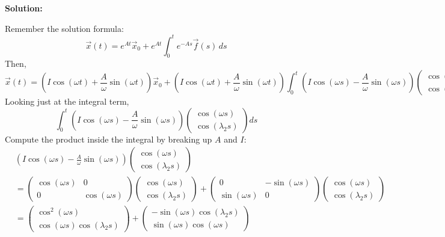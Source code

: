 \documentclass[12pt]{article}
\newenvironment{solution}{
    \textbf{Solution:}
    
}{
    
    \vspace{2em}
}
\begin{document}
\begin{solution}
    Remember the solution formula:
    \[
        \vec{x}(t) = e^{At}\vec{x}_0 + e^{At} \int_0^t e^{-As} \vec{f}(s) \, ds
    \]
    Then,
    \[
        \vec{x}(t) = \left( I \cos(\omega t) + \frac{A}{\omega} \sin(\omega t) \right) \vec{x}_0 + \left( I \cos(\omega t) + \frac{A}{\omega} \sin(\omega t) \right) \int_0^t \left( I \cos(\omega s) - \frac{A}{\omega} \sin(\omega s) \right) \begin{pmatrix} \cos(\lambda_1 s) \\ \cos(\lambda_2 s) \end{pmatrix} ds
    \]
    Looking just at the integral term,
    \[
        \int_0^t \left( I \cos(\omega s) - \frac{A}{\omega} \sin(\omega s) \right) \begin{pmatrix} \cos(\omega s) \\ \cos(\lambda_2 s) \end{pmatrix} ds
    \]
    Compute the product inside the integral by breaking up \(A\) and \(I\):
    \[
        \begin{aligned}
            &\left( I \cos(\omega s) - \frac{A}{\omega} \sin(\omega s) \right) \begin{pmatrix} \cos(\omega s) \\ \cos(\lambda_2 s) \end{pmatrix} \\
            &= \begin{pmatrix} \cos(\omega s) & 0 \\ 0 & \cos(\omega s) \end{pmatrix} \begin{pmatrix} \cos(\omega s) \\ \cos(\lambda_2 s) \end{pmatrix} + \begin{pmatrix} 0 & -\sin(\omega s) \\ \sin(\omega s) & 0 \end{pmatrix} \begin{pmatrix} \cos(\omega s) \\ \cos(\lambda_2 s) \end{pmatrix} \\
            &= \begin{pmatrix} \cos^2(\omega s) \\ \cos(\omega s)\cos(\lambda_2 s) \end{pmatrix} + \begin{pmatrix} -\sin(\omega s)\cos(\lambda_2 s) \\ \sin(\omega s)\cos(\omega s) \end{pmatrix} \\

\end{aligned}\]
\end{solution}
\end{document}
